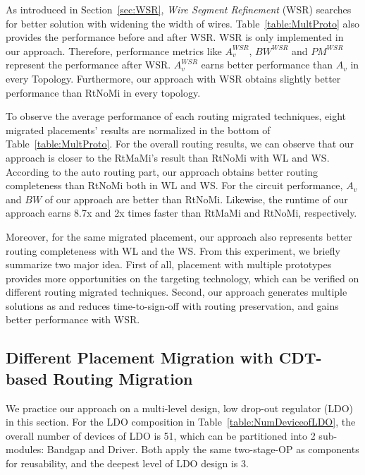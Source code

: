       As introduced in Section~\ref{sec:WSR}, {\it Wire Segment Refinement} (WSR) searches for better solution with widening the width of wires. Table~\ref{table:MultProto} also provides the performance before and after WSR. WSR is only implemented in our approach. Therefore, performance metrics like $A_v^{WSR}$, $BW^{WSR}$ and $PM^{WSR}$ represent the performance after WSR. $A_v^{WSR}$ earns better performance than $A_v$ in every Topology. Furthermore, our approach with WSR obtains slightly better performance than RtNoMi in every topology.

      To observe the average performance of each routing migrated techniques, eight migrated placements' results are normalized in the bottom of Table~\ref{table:MultProto}. For the overall routing results, we can observe that our approach is closer to the RtMaMi's result than RtNoMi with WL and WS. According to the auto routing part, our approach obtains better routing completeness than RtNoMi both in WL and WS. For the circuit performance, $A_v$ and $BW$ of our approach are better than RtNoMi. Likewise, the runtime of our approach earns 8.7x and 2x times faster than RtMaMi and RtNoMi, respectively. 

      Moreover, for the same migrated placement, our approach also represents better routing completeness with WL and the WS. From this experiment, we briefly summarize two major idea. First of all, placement with multiple prototypes provides more opportunities on the targeting technology, which can be verified on different routing migrated techniques. Second, our approach generates multiple solutions as \cite{ALP_YPWeng_iccad2011} and reduces time-to-sign-off with routing preservation, and gains better performance with WSR. 




    \subsection{Different Placement Migration with CDT-based Routing Migration}\label{subsec:ExpLDO}

      We practice our approach on a multi-level design, low drop-out regulator (LDO) in this section. For the LDO composition in Table~\ref{table:NumDeviceofLDO}, the overall number of devices of LDO is 51, which can be partitioned into 2 sub-modules: Bandgap and Driver. Both apply the same two-stage-OP as components for reusability, and the deepest level of LDO design is 3.

